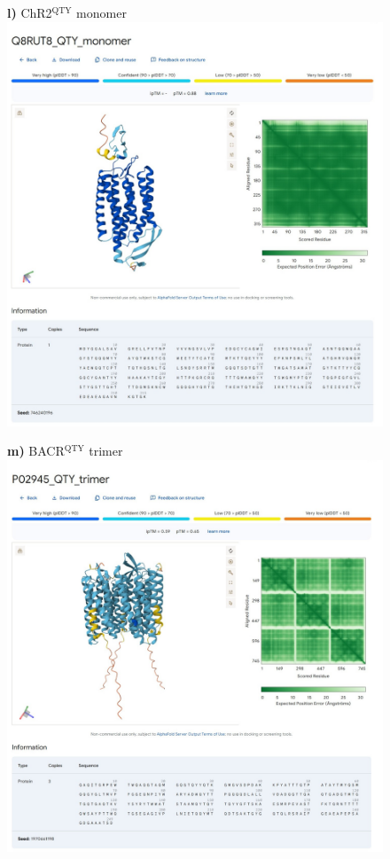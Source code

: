 \documentclass[fleqn,12pt]{supp}
\begin{document}
\newpage
\begin{figure}[H]
    \textbf{l)} ChR2$^{\textrm{QTY}}$ monomer \\
    \includegraphics[width=\linewidth]{SuppFigures/af3 chr2 qty mono.jpg}
\end{figure}

\newpage
\begin{figure}[H]
    \textbf{m)} BACR$^{\textrm{QTY}}$ trimer \\
    \includegraphics[width=\linewidth]{SuppFigures/af3 bacr qty tri.jpg}
\end{figure}
\end{document}
